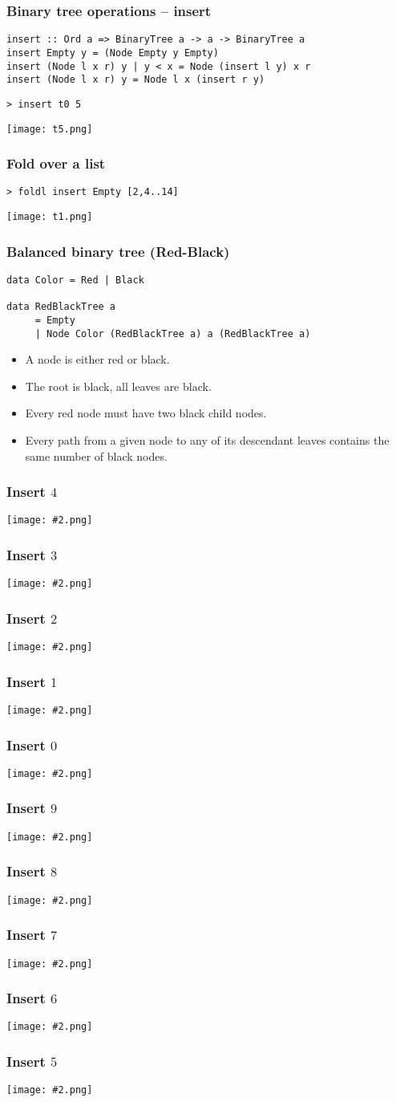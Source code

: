 \documentclass[14pt,t,usepdftitle=false,
xcolornames=x11names,svgnames,dvipsnames]{beamer}
\begin{document}
\begin{frame}
  \frametitle{Binary tree operations -- insert}
\begin{lstlisting}
insert :: Ord a => BinaryTree a -> a -> BinaryTree a
insert Empty y = (Node Empty y Empty)
insert (Node l x r) y | y < x = Node (insert l y) x r
insert (Node l x r) y = Node l x (insert r y)
\end{lstlisting}
\begin{lstlisting}[style=repl]
> insert t0 5
\end{lstlisting}
    \texttt{[image: t5.png]}
\end{frame}

\begin{frame}[fragile]
  \frametitle{Fold over a list}
\begin{lstlisting}[style=repl]
> foldl insert Empty [2,4..14]
\end{lstlisting}
\texttt{[image: t1.png]}  
\end{frame}

\begin{frame}
  \frametitle{Balanced binary tree (Red-Black)}
\begin{lstlisting}
data Color = Red | Black

data RedBlackTree a
     = Empty
     | Node Color (RedBlackTree a) a (RedBlackTree a)
\end{lstlisting}
  \begin{itemize}
  \item A node is either red or black.
\item The root is black, all leaves are black.
\item Every red node must have two black child nodes.
\item Every path from a given node to any of its descendant leaves
  contains the same number of black nodes.
  \end{itemize}
\end{frame}

\newcommand{\showanim}[2]{
  \begin{frame}
    \frametitle{Insert $#1$}
    \begin{center}
      \texttt{[image: \#2.png]}
    \end{center}
  \end{frame}}

\showanim{4}{a001}
\showanim{3}{a002}
\showanim{2}{a003}
\showanim{1}{a004}
\showanim{0}{a005}
\showanim{9}{a006}
\showanim{8}{a007}
\showanim{7}{a008}
\showanim{6}{a009}
\showanim{5}{a010}
\end{document}
